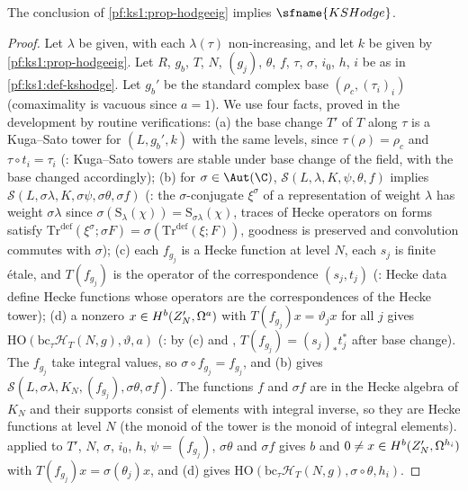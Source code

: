 \begin{proposition}\label{pf:ks1:prop-kshodge}
The conclusion of \cref{pf:ks1:prop-hodgeeig} implies $\sfname{KSHodge}$.
\end{proposition}

\begin{proof}
Let $\lambda$ be given, with each $\lambda(\tau)$ non-increasing, and let $k$ be given by \cref{pf:ks1:prop-hodgeeig}. Let $R$, $g_b$, $T$, $N$, $(g_j)$,
$\theta$, $f$, $\tau$, $\sigma$, $i_0$, $h$, $i$ be as in \cref{pf:ks1:def-kshodge}. Let $g_b'$ be the standard complex base $(\rho_c,(\tau_i)_i)$ (comaximality is
vacuous since $a=1$). We use four facts, proved in the development by routine verifications:
(a) the base change $T'$ of $T$ along $\tau$ is a Kuga--Sato tower for $(L,g_b',k)$ with the same levels, since $\tau(\rho)=\rho_c$ and $\tau\circ t_i=\tau_i$
(: Kuga--Sato towers are stable under base change of the field, with the base changed accordingly);
(b) for $\sigma\in\Aut(\C)$, $\mathcal S(L,\lambda,K,\psi,\theta,f)$ implies $\mathcal S(L,\sigma\lambda,K,\sigma\psi,\sigma\theta,\sigma f)$
(: the $\sigma$-conjugate $\xi^\sigma$ of a representation of weight $\lambda$ has weight $\sigma\lambda$
since $\sigma(\mathrm{S}_\lambda(\chi))=\mathrm{S}_{\sigma\lambda}(\chi)$, traces of Hecke operators on forms satisfy
$\mathrm{Tr}^{\mathrm{def}}(\xi^\sigma;\sigma F)=\sigma(\mathrm{Tr}^{\mathrm{def}}(\xi;F))$, goodness is preserved and convolution commutes with $\sigma$);
(c) each $f_{g_j}$ is a Hecke function at level $N$, each $s_j$ is finite \'etale, and $T(f_{g_j})$ is the operator of the correspondence $(s_j,t_j)$
(: Hecke data define Hecke functions whose operators are the correspondences of the Hecke tower);
(d) a nonzero $x\in\ksoneH{Z'_N}{a}{b}$ with $T(f_{g_j})x=\vartheta_jx$ for all $j$ gives $\mathrm{HO}(\mathrm{bc}_\tau\mathcal H_T(N,g),\vartheta,a)$
(: by (c) and , $T(f_{g_j})=(s_j)_*t_j^*$ after base change).
The $f_{g_j}$ take integral values, so $\sigma\circ f_{g_j}=f_{g_j}$, and (b) gives $\mathcal S(L,\sigma\lambda,K_N,(f_{g_j}),\sigma\theta,\sigma f)$. The functions $f$ and
$\sigma f$ are in the Hecke algebra of $K_N$ and their supports consist of elements with integral inverse, so they are Hecke functions at level $N$ (the
monoid of the tower is the monoid of integral elements).  applied to $T'$, $N$, $\sigma$, $i_0$, $h$, $\psi=(f_{g_j})$, $\sigma\theta$ and
$\sigma f$ gives $b$ and $0\neq x\in\ksoneH{Z'_N}{h_i}{b}$ with $T(f_{g_j})x=\sigma(\theta_j)x$, and (d) gives
$\mathrm{HO}(\mathrm{bc}_\tau\mathcal H_T(N,g),\sigma\circ\theta,h_i)$.
\end{proof}

